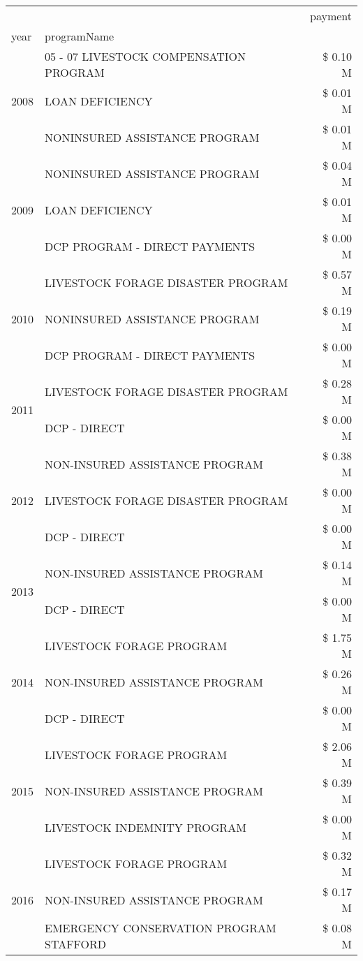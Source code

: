 \begin{tabular}{llr}
\toprule
 &  & payment \\
year & programName &  \\
\midrule
\multirow[t]{3}{*}{2008} & 05 - 07 LIVESTOCK COMPENSATION PROGRAM & \$ 0.10 M \\
 & LOAN DEFICIENCY & \$ 0.01 M \\
 & NONINSURED ASSISTANCE PROGRAM & \$ 0.01 M \\
\cline{1-3}
\multirow[t]{3}{*}{2009} & NONINSURED ASSISTANCE PROGRAM & \$ 0.04 M \\
 & LOAN DEFICIENCY & \$ 0.01 M \\
 & DCP PROGRAM - DIRECT PAYMENTS & \$ 0.00 M \\
\cline{1-3}
\multirow[t]{3}{*}{2010} & LIVESTOCK FORAGE DISASTER  PROGRAM & \$ 0.57 M \\
 & NONINSURED ASSISTANCE PROGRAM & \$ 0.19 M \\
 & DCP PROGRAM - DIRECT PAYMENTS & \$ 0.00 M \\
\cline{1-3}
\multirow[t]{2}{*}{2011} & LIVESTOCK FORAGE DISASTER PROGRAM & \$ 0.28 M \\
 & DCP - DIRECT & \$ 0.00 M \\
\cline{1-3}
\multirow[t]{3}{*}{2012} & NON-INSURED ASSISTANCE PROGRAM & \$ 0.38 M \\
 & LIVESTOCK FORAGE DISASTER PROGRAM & \$ 0.00 M \\
 & DCP - DIRECT & \$ 0.00 M \\
\cline{1-3}
\multirow[t]{2}{*}{2013} & NON-INSURED ASSISTANCE PROGRAM & \$ 0.14 M \\
 & DCP - DIRECT & \$ 0.00 M \\
\cline{1-3}
\multirow[t]{3}{*}{2014} & LIVESTOCK FORAGE PROGRAM & \$ 1.75 M \\
 & NON-INSURED ASSISTANCE PROGRAM & \$ 0.26 M \\
 & DCP - DIRECT & \$ 0.00 M \\
\cline{1-3}
\multirow[t]{3}{*}{2015} & LIVESTOCK FORAGE PROGRAM & \$ 2.06 M \\
 & NON-INSURED ASSISTANCE PROGRAM & \$ 0.39 M \\
 & LIVESTOCK INDEMNITY PROGRAM & \$ 0.00 M \\
\cline{1-3}
\multirow[t]{3}{*}{2016} & LIVESTOCK FORAGE PROGRAM & \$ 0.32 M \\
 & NON-INSURED ASSISTANCE PROGRAM & \$ 0.17 M \\
 & EMERGENCY CONSERVATION PROGRAM STAFFORD & \$ 0.08 M \\

\end{tabular}
